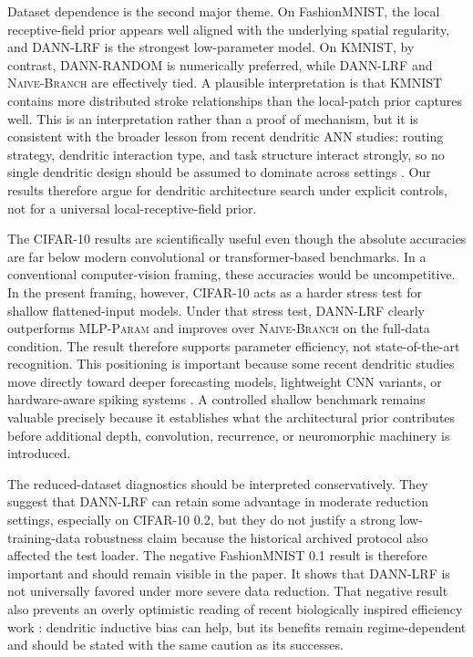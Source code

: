 \documentclass[preprint,12pt]{elsarticle}
\newcommand{\DANNLRF}{\textsc{DANN-LRF}}
\newcommand{\DANNRANDOM}{\textsc{DANN-RANDOM}}
\newcommand{\NAIVEBRANCH}{\textsc{Naive-Branch}}
\newcommand{\MLPPARAM}{\textsc{MLP-Param}}
\begin{document}
Dataset dependence is the second major theme. On FashionMNIST, the local receptive-field prior appears well aligned with the underlying spatial regularity, and \DANNLRF{} is the strongest low-parameter model. On KMNIST, by contrast, \DANNRANDOM{} is numerically preferred, while \DANNLRF{} and \NAIVEBRANCH{} are effectively tied. A plausible interpretation is that KMNIST contains more distributed stroke relationships than the local-patch prior captures well. This is an interpretation rather than a proof of mechanism, but it is consistent with the broader lesson from recent dendritic ANN studies: routing strategy, dendritic interaction type, and task structure interact strongly, so no single dendritic design should be assumed to dominate across settings \cite{tang2024dnn,egrioglu2024deepdann,li2024alternating,liu2024capturecorr}. Our results therefore argue for dendritic architecture search under explicit controls, not for a universal local-receptive-field prior.

The CIFAR-10 results are scientifically useful even though the absolute accuracies are far below modern convolutional or transformer-based benchmarks. In a conventional computer-vision framing, these accuracies would be uncompetitive. In the present framing, however, CIFAR-10 acts as a harder stress test for shallow flattened-input models. Under that stress test, \DANNLRF{} clearly outperforms \MLPPARAM{} and improves over \NAIVEBRANCH{} on the full-data condition. The result therefore supports parameter efficiency, not state-of-the-art recognition. This positioning is important because some recent dendritic studies move directly toward deeper forecasting models, lightweight CNN variants, or hardware-aware spiking systems \cite{egrioglu2024deepdann,du2025shuffle,pagkalos2023dendrify,zheng2024temporal,dagostino2024denram}. A controlled shallow benchmark remains valuable precisely because it establishes what the architectural prior contributes before additional depth, convolution, recurrence, or neuromorphic machinery is introduced.

The reduced-dataset diagnostics should be interpreted conservatively. They suggest that \DANNLRF{} can retain some advantage in moderate reduction settings, especially on CIFAR-10 0.2, but they do not justify a strong low-training-data robustness claim because the historical archived protocol also affected the test loader. The negative FashionMNIST 0.1 result is therefore important and should remain visible in the paper. It shows that \DANNLRF{} is not universally favored under more severe data reduction. That negative result also prevents an overly optimistic reading of recent biologically inspired efficiency work \cite{bird2021dendriticnorm,chavlis2025parameter}: dendritic inductive bias can help, but its benefits remain regime-dependent and should be stated with the same caution as its successes.
\end{document}
